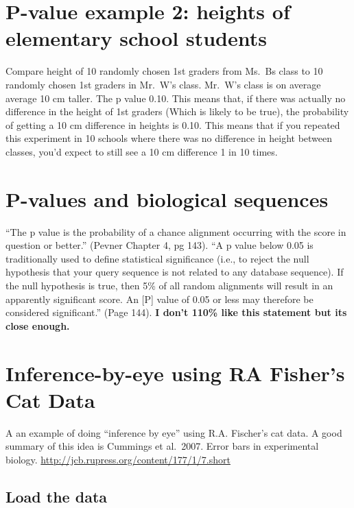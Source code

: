 \documentclass[
]{book}
\begin{document}
\hypertarget{p-value-example-2-heights-of-elementary-school-students}{%
\chapter{P-value example 2: heights of elementary school students}\label{p-value-example-2-heights-of-elementary-school-students}}

Compare height of 10 randomly chosen 1st graders from Ms.~Bs class to 10 randomly chosen 1st graders in Mr.~W's class. Mr.~W's class is on average average 10 cm taller. The p value 0.10. This means that, if there was actually no difference in the height of 1st graders (Which is likely to be true), the probability of getting a 10 cm difference in heights is 0.10. This means that if you repeated this experiment in 10 schools where there was no difference in height between classes, you'd expect to still see a 10 cm difference 1 in 10 times.

\hypertarget{p-values-and-biological-sequences}{%
\chapter{P-values and biological sequences}\label{p-values-and-biological-sequences}}

``The p value is the probability of a chance alignment occurring with the score in question
or better.'' (Pevner Chapter 4, pg 143). ``A p value below 0.05 is traditionally used to define statistical significance (i.e., to reject the null hypothesis that your query sequence is not related to any database sequence). If the null hypothesis is true, then 5\% of all random alignments will result in an apparently significant score. An {[}P{]} value of 0.05 or less may therefore be considered significant.'' (Page 144). \textbf{I don't 110\% like this statement but its close enough.}

\hypertarget{inference-by-eye-using-ra-fishers-cat-data}{%
\chapter{Inference-by-eye using RA Fisher's Cat Data}\label{inference-by-eye-using-ra-fishers-cat-data}}

A an example of doing ``inference by eye'' using R.A. Fischer's cat data. A good summary of this idea is Cummings et al.~2007. Error bars in experimental biology. \url{http://jcb.rupress.org/content/177/1/7.short}

\hypertarget{load-the-data}{%
\section{Load the data}\label{load-the-data}}
\end{document}
